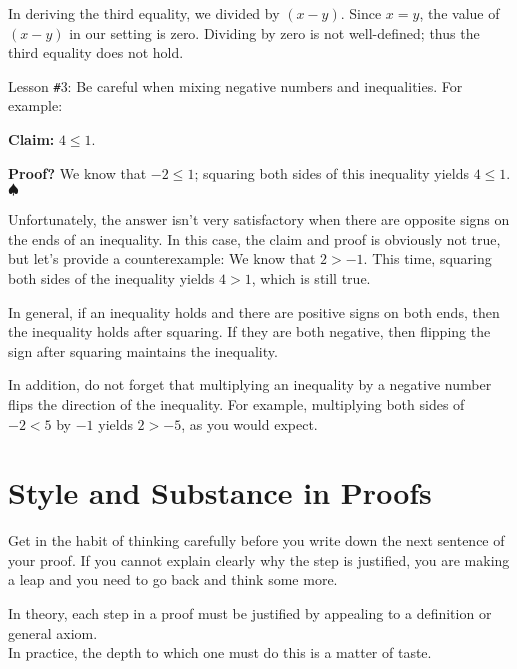 \documentclass[12pt,a4paper]{article}
\theoremstyle{definition}
\begin{document}
\bigbreak

In deriving the third equality, we divided by $(x-y)$. Since $x=y$, the value of $(x-y)$ in our setting is zero. Dividing by zero is not well-defined; thus the third equality does not hold.

\bigbreak

Lesson \texttt{\#}3: Be careful when mixing negative numbers and inequalities. For example:

\bigbreak

\textbf{Claim:} $4\leq1$.

\bigbreak

\textbf{Proof?} We know that $-2\leq1$; squaring both sides of this inequality yields $4\leq1$. $\spadesuit$

\bigbreak

Unfortunately, the answer isn't very satisfactory when there are opposite signs on the ends of an inequality. In this case, the claim and proof is obviously not true, but let's provide a counterexample: We know that $2>-1$. This time, squaring both sides of the inequality yields $4>1$, which is still true.

\bigbreak

In general, if an inequality holds and there are positive signs on both ends, then the inequality holds after squaring. If they are both negative, then flipping the sign after squaring maintains the inequality.

\bigbreak

In addition, do not forget that multiplying an inequality by a negative number flips the direction of the inequality. For example, multiplying both sides of $-2<5$ by $-1$ yields $2>-5$, as you would expect.

\section*{Style and Substance in Proofs}

Get in the habit of thinking carefully before you write down the next sentence of your proof. If you cannot explain clearly why the step is justified, you are making a leap and you need to go back and think some more.

\bigbreak

In theory, each step in a proof must be justified by appealing to a definition or general axiom. \\
In practice, the depth to which one must do this is a matter of taste.

\bigbreak
\end{document}
